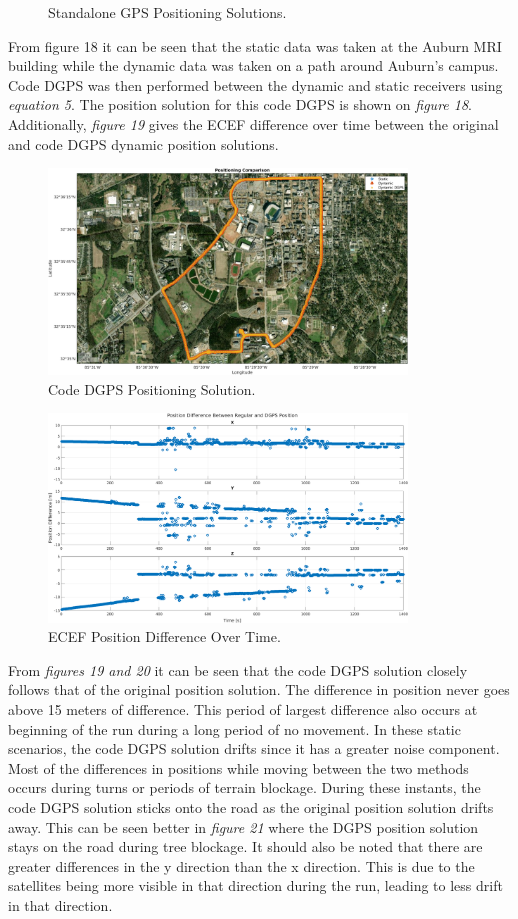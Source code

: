 \documentclass[11pt]{article}
\begin{document}
\begin{enumerate}[label=\textbf{\arabic*.}]
\begin{figure}[H]
        \caption{Standalone GPS Positioning Solutions.}
    \end{figure}
From figure 18 it can be seen that the static data was taken at the Auburn MRI building while the dynamic data was taken on a path around Auburn's campus. Code DGPS was then performed between the dynamic and static receivers using \emph{equation 5}. The position solution for this code DGPS is shown on \emph{figure 18}. Additionally, \emph{figure 19} gives the ECEF difference over time between the original and code DGPS dynamic position solutions. 
  \begin{figure}[H]
        \centering
        \includegraphics[width=0.85\textwidth]{p4_d.png}
        \caption{Code DGPS Positioning Solution.}
    \end{figure}
      \begin{figure}[H]
        \centering
        \includegraphics[width=0.85\textwidth]{p4_c.png}
        \caption{ECEF Position Difference Over Time.}
    \end{figure}
From \emph{figures 19 and 20} it can be seen that the  code DGPS solution closely follows that of the original position solution. The difference in position never goes above 15 meters of difference. This period of largest difference also occurs at beginning of the run during a long period of no movement. In these static scenarios, the code DGPS solution drifts since it has a greater noise component. Most of the differences in positions while moving  between the two methods occurs during turns or periods of terrain blockage. During these instants, the code DGPS solution sticks onto the road as the original position solution drifts away. This can be seen better in \emph{figure 21} where the DGPS position solution stays on the road during tree blockage. It should also be noted that there are greater differences in the y direction than the x direction. This is due to the satellites being more visible in that direction during the run, leading to less drift in that direction.

\end{enumerate}
\end{document}
